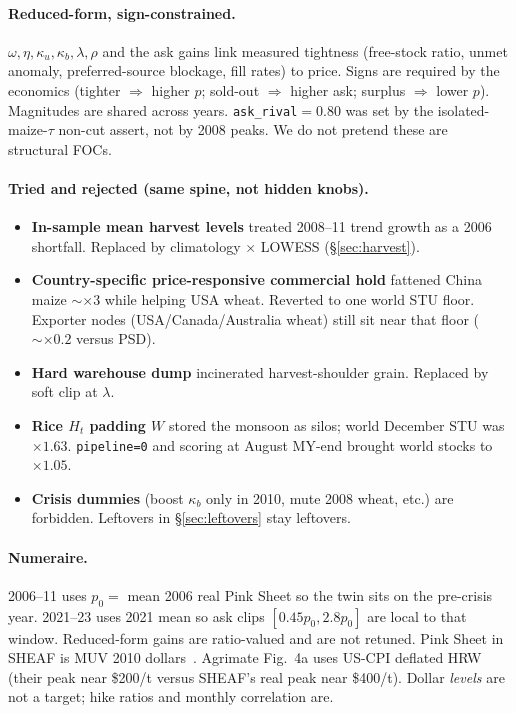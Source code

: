 \documentclass[11pt,a4paper]{article}
\begin{document}
\paragraph{Reduced-form, sign-constrained.}
$\omega,\eta,\kappa_u,\kappa_b,\lambda,\rho$ and the ask gains link
measured tightness (free-stock ratio, unmet anomaly, preferred-source
blockage, fill rates) to price. Signs are required by the economics
(tighter $\Rightarrow$ higher $p$; sold-out $\Rightarrow$ higher ask;
surplus $\Rightarrow$ lower $p$). Magnitudes are shared across years.
\texttt{ask\_rival}$=0.80$ was set by the isolated-maize-$\tau$ non-cut
assert, not by 2008 peaks. We do not pretend these are structural FOCs.

\paragraph{Tried and rejected (same spine, not hidden knobs).}
\begin{itemize}
\item \textbf{In-sample mean harvest levels} treated 2008--11 trend growth
      as a 2006 shortfall. Replaced by climatology $\times$ LOWESS
      (\S\ref{sec:harvest}).
\item \textbf{Country-specific price-responsive commercial hold} fattened
      China maize $\sim\times 3$ while helping USA wheat. Reverted to one
      world STU floor. Exporter nodes (USA/Canada/Australia wheat) still
      sit near that floor ($\sim\times 0.2$ versus PSD).
\item \textbf{Hard warehouse dump} incinerated harvest-shoulder grain.
      Replaced by soft clip at $\lambda$.
\item \textbf{Rice $H_t$ padding $W$} stored the monsoon as silos; world
      December STU was $\times 1.63$. \texttt{pipeline=0} and scoring at
      August MY-end brought world stocks to $\times 1.05$.
\item \textbf{Crisis dummies} (boost $\kappa_b$ only in 2010, mute 2008
      wheat, etc.) are forbidden. Leftovers in \S\ref{sec:leftovers}
      stay leftovers.
\end{itemize}

\paragraph{Numeraire.}
2006--11 uses $p_0=$ mean 2006 real Pink Sheet so the twin sits on the
pre-crisis year. 2021--23 uses 2021 mean so ask clips
$[0.45p_0,2.8p_0]$ are local to that window. Reduced-form gains are
ratio-valued and are not retuned. Pink Sheet in SHEAF is MUV 2010
dollars~\citep{worldbank_pink}. Agrimate Fig.~4a uses US-CPI deflated HRW
(their peak near \$200/t versus SHEAF's real peak near \$400/t). Dollar
\emph{levels} are not a target; hike ratios and monthly correlation are.
\end{document}
